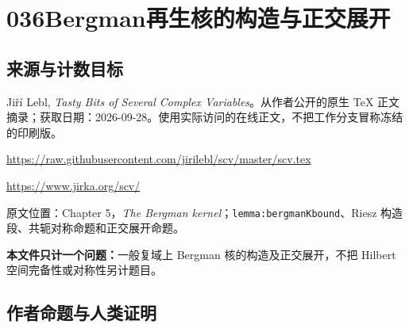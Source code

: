 \documentclass[UTF8,11pt]{ctexart}
\theoremstyle{definition}
\begin{document}
\section*{036\quad Bergman再生核的构造与正交展开}
\subsection*{来源与计数目标}
Ji\v{r}\'i Lebl, \emph{Tasty Bits of Several Complex Variables}。从作者公开的原生 TeX 正文摘录；获取日期：2026-09-28。使用实际访问的在线正文，不把工作分支冒称冻结的印刷版。
\par\url{https://raw.githubusercontent.com/jirilebl/scv/master/scv.tex}
\par\url{https://www.jirka.org/scv/}
\par 原文位置：Chapter 5，\emph{The Bergman kernel}；\nolinkurl{lemma:bergmanKbound}、Riesz 构造段、共轭对称命题和正交展开命题。
\par\textbf{本文件只计一个问题：}一般复域上 Bergman 核的构造及正交展开，不把 Hilbert 空间完备性或对称性另计题目。
\subsection*{作者命题与人类证明}
\end{document}
